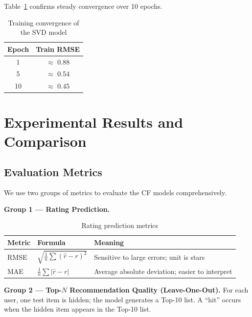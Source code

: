 \documentclass[12pt, a4paper]{article}
\begin{document}
Table~\ref{tab:svd_convergence} confirms steady convergence over 10 epochs.

\begin{table}[H]
  \centering
  \caption{Training convergence of the SVD model}
  \label{tab:svd_convergence}
  \begin{tabular}{|c|c|}
    \hline
    \textbf{Epoch} & \textbf{Train RMSE} \\
    \hline
    1  & $\approx$ 0.88 \\
    \hline
    5  & $\approx$ 0.54 \\
    \hline
    10 & $\approx$ 0.45 \\
    \hline
  \end{tabular}
\end{table}

\newpage
\section{Experimental Results and Comparison}
\label{sec:results}

\subsection{Evaluation Metrics}

We use two groups of metrics to evaluate the CF models comprehensively.

\textbf{Group 1 --- Rating Prediction.}

\begin{table}[H]
  \centering
  \caption{Rating prediction metrics}
  \label{tab:metrics_rating}
  \begin{tabular}{|l|l|p{6.5cm}|}
    \hline
    \textbf{Metric} & \textbf{Formula} & \textbf{Meaning} \\
    \hline
    RMSE & $\sqrt{\frac{1}{n}\sum({\hat{r} - r})^2}$ & Sensitive to large errors; unit is stars \\
    \hline
    MAE  & $\frac{1}{n}\sum|\hat{r} - r|$             & Average absolute deviation; easier to interpret \\
    \hline
  \end{tabular}
\end{table}

\textbf{Group 2 --- Top-$N$ Recommendation Quality (Leave-One-Out).}
For each user, one test item is hidden; the model generates a Top-10 list.
A ``hit'' occurs when the hidden item appears in the Top-10 list.
\end{document}
